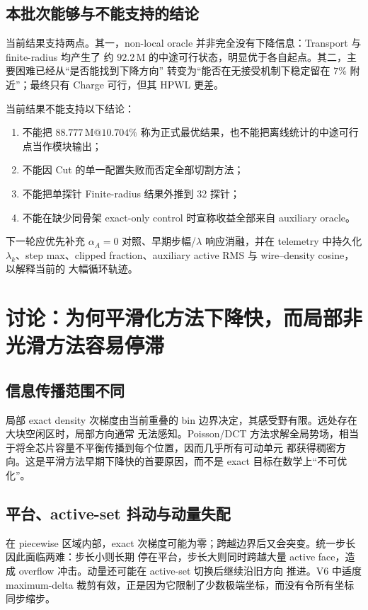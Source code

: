 \documentclass[UTF8,a4paper,11pt]{ctexart}
\begin{document}
\subsection{本批次能够与不能支持的结论}

当前结果支持两点。其一，non-local oracle 并非完全没有下降信息：Transport 与 finite-radius 均产生了
约 $92.2\,\mathrm{M}$ 的中途可行状态，明显优于各自起点。其二，主要困难已经从“是否能找到下降方向”
转变为“能否在无接受机制下稳定留在 $7\%$ 附近”；最终只有 Charge 可行，但其 HPWL 更差。

当前结果不能支持以下结论：
\begin{enumerate}
  \item 不能把 $88.777\,\mathrm{M}@10.704\%$ 称为正式最优结果，也不能把离线统计的中途可行点当作模块输出；
  \item 不能因 Cut 的单一配置失败而否定全部切割方法；
  \item 不能把单探针 Finite-radius 结果外推到 32 探针；
  \item 不能在缺少同骨架 exact-only control 时宣称收益全部来自 auxiliary oracle。
\end{enumerate}
下一轮应优先补充 $\alpha_A=0$ 对照、早期步幅/$\lambda$ 响应消融，并在 telemetry 中持久化
$\lambda_k$、step max、clipped fraction、auxiliary active RMS 与 wire--density cosine，以解释当前的
大幅循环轨迹。

\section{讨论：为何平滑化方法下降快，而局部非光滑方法容易停滞}

\subsection{信息传播范围不同}

局部 exact density 次梯度由当前重叠的 bin 边界决定，其感受野有限。远处存在大块空闲区时，局部方向通常
无法感知。Poisson/DCT 方法求解全局势场，相当于将全芯片容量不平衡传播到每个位置，因而几乎所有可动单元
都获得稠密方向。这是平滑方法早期下降快的首要原因，而不是 exact 目标在数学上“不可优化”。

\subsection{平台、active-set 抖动与动量失配}

在 piecewise 区域内部，exact 次梯度可能为零；跨越边界后又会突变。统一步长因此面临两难：步长小则长期
停在平台，步长大则同时跨越大量 active face，造成 overflow 冲击。动量还可能在 active-set 切换后继续沿旧方向
推进。V6 中适度 maximum-delta 裁剪有效，正是因为它限制了少数极端坐标，而没有令所有坐标同步缩步。
\end{document}
